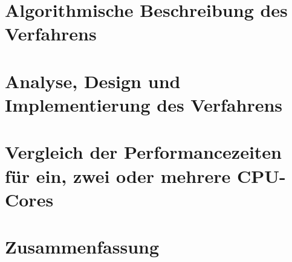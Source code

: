 \documentclass[11pt]{scrreprt} %
\theoremstyle{definition}
\begin{document}
\chapter{Algorithmische Beschreibung des Verfahrens}

\chapter{Analyse, Design und Implementierung des Verfahrens}
\label{sec:analyse}

\chapter{Vergleich der Performancezeiten für ein, zwei oder mehrere CPU-Cores}

\chapter{Zusammenfassung}




\listoffigures
\listoftables
\end{document}
